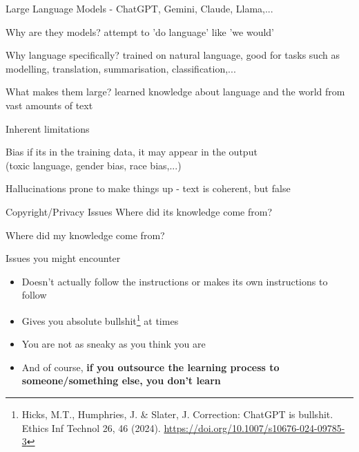 \documentclass[aspectratio=169,hyperref={unicode}]{beamer}
\begin{document}
\begin{frame}{Large Language Models - ChatGPT, Gemini, Claude, Llama,...}
\begin{alertblock}{Why are they models?}
attempt to 'do language' like 'we would'
\end{alertblock}

\begin{alertblock}{Why language specifically?}
trained on natural language, good for tasks such as modelling, translation, summarisation, classification,...
\end{alertblock}

\begin{alertblock}{What makes them large?}
learned knowledge about language and the world from vast amounts of text
\end{alertblock}

\end{frame}

\begin{frame}{Inherent limitations}
\begin{alertblock}{Bias}
if its in the training data, it may appear in the output\\
(toxic language, gender bias, race bias,...)
\end{alertblock}

\begin{alertblock}{Hallucinations}
prone to make things up - text is coherent, but false	
\end{alertblock}

\begin{alertblock}{Copyright/Privacy Issues}
Where did its knowledge come from?

Where did my knowledge come from?
	
\end{alertblock}

\end{frame}

\begin{frame}{Issues you might encounter}
	\begin{itemize}
		\item Doesn't actually follow the instructions or makes its own instructions to follow
		\item Gives you absolute bullshit\footnote{Hicks, M.T., Humphries, J. \& Slater, J. Correction: ChatGPT is bullshit. Ethics Inf Technol 26, 46 (2024). \url{https://doi.org/10.1007/s10676-024-09785-3}} at times
		\item You are not as sneaky as you think you are
		\item And of course, \textbf{if you outsource the learning process to someone/something else, you don't learn}
	\end{itemize}
	\end{frame}
	
\end{document}
